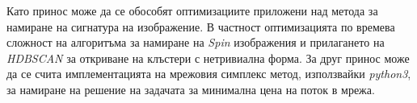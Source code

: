 \documentclass[a4paper,12pt]{article}
\begin{document}
\bigbreak

Като принос може да се обособят оптимизациите приложени над метода за намиране на сигнатура на изображение. В частност оптимизацията по времева сложност на алгоритъма за намиране на \textit{Spin} изображения и прилагането на \textit{HDBSCAN} за откриване на клъстери с нетривиална форма. За друг принос може да се счита имплементацията на мрежовия симплекс метод, използвайки \textit{python3}, за намиране на решение на задачата за минимална цена на поток в мрежа.

\printbibliography[title={Използвана литература}]
\end{document}
